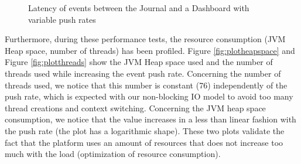 \begin{figure}
  \begin{center} 
    \caption{Latency of events between the Journal and a Dashboard with variable push rates}
    \label{fig:severalrates}
  \end{center}
\end{figure}

Furthermore, during these performance tests, the resource consumption (JVM Heap space, number of threads) has been profiled. Figure \ref{fig:plotheapspace} and Figure \ref{fig:plotthreads} show the JVM Heap space used and the number of threads used while increasing the event push rate.
Concerning the number of threads used, we notice that this number is constant (76) independently of the push rate, which is expected with our non-blocking IO model to avoid too many thread creations and context switching.
Concerning the JVM heap space consumption, we notice that the value increases in a less than linear fashion with the push rate (the plot has a logarithmic shape).
These two plots validate the fact that the platform uses an amount of resources that does not increase too much with the load (optimization of resource consumption).

